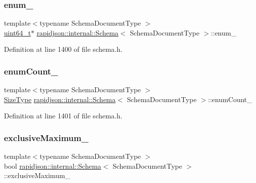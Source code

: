 \subsubsection{\texorpdfstring{enum\_}{enum\_}}
{\footnotesize\ttfamily template$<$typename Schema\+Document\+Type $>$ \\
\mbox{\hyperlink{stdint_8h_aec6fcb673ff035718c238c8c9d544c47}{uint64\+\_\+t}}$\ast$ \mbox{\hyperlink{classrapidjson_1_1internal_1_1_schema}{rapidjson\+::internal\+::\+Schema}}$<$ Schema\+Document\+Type $>$\+::enum\+\_\+\hspace{0.3cm}{\ttfamily [private]}}



Definition at line 1400 of file schema.\+h.

\mbox{\label{classrapidjson_1_1internal_1_1_schema_a6d65bd33dfc9ce5eee827e3b0953a68a}} 
\subsubsection{\texorpdfstring{enumCount\_}{enumCount\_}}
{\footnotesize\ttfamily template$<$typename Schema\+Document\+Type $>$ \\
\mbox{\hyperlink{namespacerapidjson_a44eb33eaa523e36d466b1ced64b85c84}{Size\+Type}} \mbox{\hyperlink{classrapidjson_1_1internal_1_1_schema}{rapidjson\+::internal\+::\+Schema}}$<$ Schema\+Document\+Type $>$\+::enum\+Count\+\_\+\hspace{0.3cm}{\ttfamily [private]}}



Definition at line 1401 of file schema.\+h.

\mbox{\label{classrapidjson_1_1internal_1_1_schema_a92c1c5d8021ecd20a9dc62414c0c0fbc}} 
\subsubsection{\texorpdfstring{exclusiveMaximum\_}{exclusiveMaximum\_}}
{\footnotesize\ttfamily template$<$typename Schema\+Document\+Type $>$ \\
bool \mbox{\hyperlink{classrapidjson_1_1internal_1_1_schema}{rapidjson\+::internal\+::\+Schema}}$<$ Schema\+Document\+Type $>$\+::exclusive\+Maximum\+\_\+\hspace{0.3cm}{\ttfamily [private]}}



